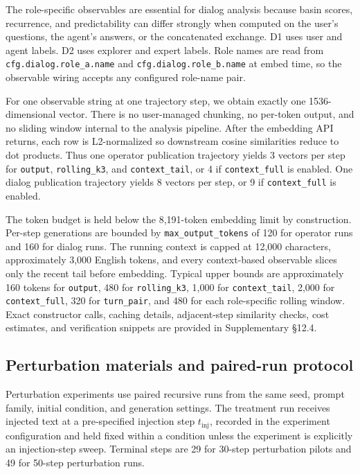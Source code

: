 \documentclass{article}
\theoremstyle{plain}
\theoremstyle{definition}
\begin{document}
The role-specific observables are essential for dialog analysis because basin scores, recurrence, and predictability can differ strongly when computed on the user's questions, the agent's answers, or the concatenated exchange. D1 uses user and agent labels. D2 uses explorer and expert labels. Role names are read from \texttt{cfg.dialog.role\_a.name} and \texttt{cfg.dialog.role\_b.name} at embed time, so the observable wiring accepts any configured role-name pair.

For one observable string at one trajectory step, we obtain exactly one 1536-dimensional vector. There is no user-managed chunking, no per-token output, and no sliding window internal to the analysis pipeline. After the embedding API returns, each row is L2-normalized so downstream cosine similarities reduce to dot products. Thus one operator publication trajectory yields 3 vectors per step for \texttt{output}, \texttt{rolling\_k3}, and \texttt{context\_tail}, or 4 if \texttt{context\_full} is enabled. One dialog publication trajectory yields 8 vectors per step, or 9 if \texttt{context\_full} is enabled.

The token budget is held below the 8,191-token embedding limit by construction. Per-step generations are bounded by \texttt{max\_output\_tokens} of 120 for operator runs and 160 for dialog runs. The running context is capped at 12,000 characters, approximately 3,000 English tokens, and every context-based observable slices only the recent tail before embedding. Typical upper bounds are approximately 160 tokens for \texttt{output}, 480 for \texttt{rolling\_k3}, 1,000 for \texttt{context\_tail}, 2,000 for \texttt{context\_full}, 320 for \texttt{turn\_pair}, and 480 for each role-specific rolling window. Exact constructor calls, caching details, adjacent-step similarity checks, cost estimates, and verification snippets are provided in Supplementary §12.4.

\subsection{Perturbation materials and paired-run protocol}

Perturbation experiments use paired recursive runs from the same seed, prompt family, initial condition, and generation settings. The treatment run receives injected text at a pre-specified injection step \(t_{\mathrm{inj}}\), recorded in the experiment configuration and held fixed within a condition unless the experiment is explicitly an injection-step sweep. Terminal steps are 29 for 30-step perturbation pilots and 49 for 50-step perturbation runs.
\end{document}
